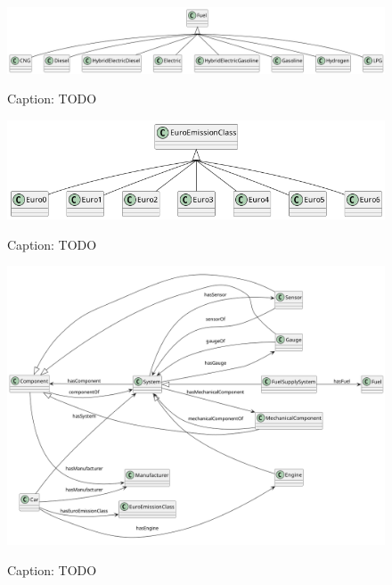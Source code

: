 \begin{figure}[H]
    \caption{Caption: TODO}
    \includegraphics[width=\textwidth]{figures/carpedia-fuel.png}
    \label{fig:carpedia-fuel}
\end{figure}

\begin{figure}[H]
    \caption{Caption: TODO}
    \includegraphics[width=\textwidth]{figures/carpedia-euro-emission.png}
    \label{fig:carpedia-euro-emission}
\end{figure}

\begin{figure}[H]
    \caption{Caption: TODO}
    \includegraphics[width=\textwidth]{figures/carpedia-object-properties.png}
    \label{fig:carpedia-object-properties}
\end{figure}

